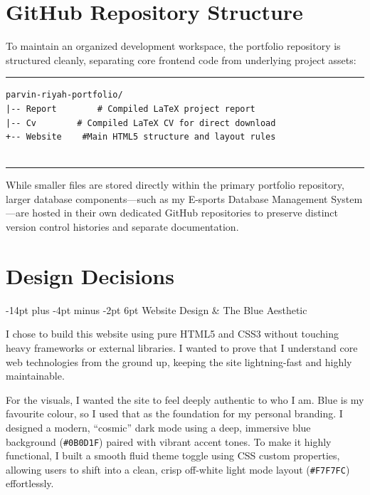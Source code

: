 \documentclass[12pt, a4paper]{report}
\makeatletter
\renewcommand\section{%
  \@startsection{section}{1}{\z@}%
    {-14pt plus -4pt minus -2pt}%
    {6pt}%
    {\normalfont\fontsize{14}{18}\bfseries\color{midPurple}}%
}
\makeatother
\begin{document}
\chapter{GitHub Repository Structure}

To maintain an organized development workspace, the portfolio repository is
structured cleanly, separating core frontend code from underlying project
assets:

\noindent\textcolor{midPurple}{\rule{\linewidth}{0.5pt}}
{\small
\begin{verbatim}
parvin-riyah-portfolio/
|-- Report        # Compiled LaTeX project report
|-- Cv        # Compiled LaTeX CV for direct download
+-- Website    #Main HTML5 structure and layout rules
    
\end{verbatim}
}
\noindent\textcolor{midPurple}{\rule{\linewidth}{0.5pt}}

While smaller files are stored directly within the primary portfolio
repository, larger database components---such as my E-sports Database
Management System---are hosted in their own dedicated GitHub repositories to
preserve distinct version control histories and separate documentation.

\chapter{Design Decisions}

\section{Website Design \& The Blue Aesthetic}

I chose to build this website using pure HTML5 and CSS3 without touching
heavy frameworks or external libraries. I wanted to prove that I understand
core web technologies from the ground up, keeping the site lightning-fast
and highly maintainable.

For the visuals, I wanted the site to feel deeply authentic to who I am.
Blue is my favourite colour, so I used that as the foundation for my
personal branding. I designed a modern, ``cosmic'' dark mode using a deep,
immersive blue background (\verb|#0B0D1F|) paired with vibrant accent tones.
To make it highly functional, I built a smooth fluid theme toggle using CSS
custom properties, allowing users to shift into a clean, crisp off-white
light mode layout (\verb|#F7F7FC|) effortlessly.
\end{document}
